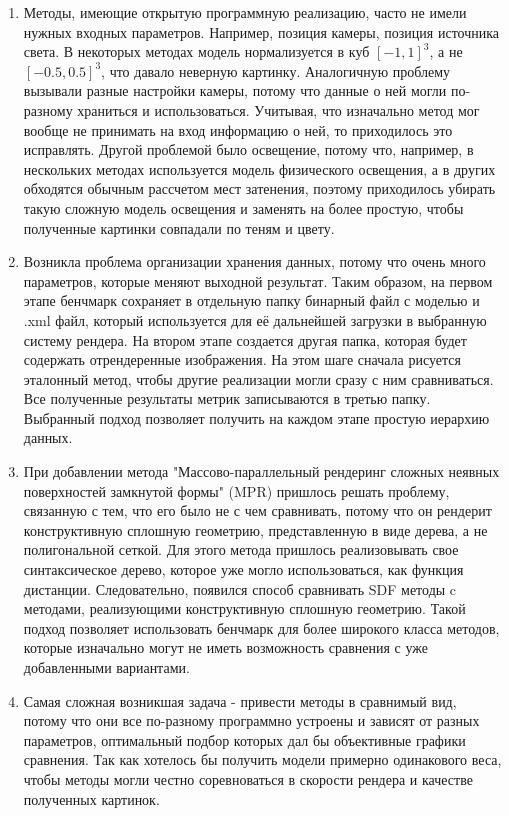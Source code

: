 \documentclass[a4paper,hidelinks,12pt]{article}
\begin{document}
\begin{enumerate}
	\item Методы, имеющие открытую программную реализацию, часто не имели нужных входных параметров. Например, позиция камеры, позиция источника света. В некоторых методах 
	модель нормализуется в куб $[-1, 1]^3$, а не $[-0.5, 0.5]^3$, что давало неверную картинку. Аналогичную проблему вызывали разные настройки камеры, потому что 
	данные о ней могли по-разному храниться и использоваться. Учитывая, что изначально метод мог вообще не принимать на вход информацию о ней, то приходилось 
	это исправлять. Другой проблемой было освещение, потому что, например, в нескольких методах используется модель физического освещения, а в других 
	обходятся обычным рассчетом мест затенения, поэтому приходилось убирать такую сложную модель освещения и заменять на более простую, чтобы полученные картинки 
	совпадали по теням и цвету. 
	\item Возникла проблема организации хранения данных, потому что очень много параметров, которые меняют выходной результат. Таким образом, на первом этапе 
	бенчмарк сохраняет в отдельную папку бинарный файл с моделью и .xml файл, который используется для её дальнейшей загрузки в выбранную систему рендера. На втором этапе создается 
	другая папка, которая будет содержать отрендеренные изображения. На этом шаге сначала рисуется эталонный метод, чтобы другие реализации могли сразу с ним 
	сравниваться. Все полученные результаты метрик записываются в третью папку. Выбранный подход позволяет получить на каждом этапе простую иерархию данных.
	\item При добавлении метода "Массово-параллельный рендеринг сложных неявных поверхностей замкнутой формы" (MPR) пришлось решать проблему, связанную с тем, 
	что его было не с чем сравнивать, потому что он рендерит конструктивную сплошную геометрию, представленную в виде дерева, а не полигональной сеткой. Для этого метода пришлось 
	реализовывать свое синтаксическое дерево, которое уже могло использоваться, как функция дистанции. Следовательно, появился способ сравнивать SDF методы c 
	методами, реализующими конструктивную сплошную геометрию. Такой подход позволяет использовать бенчмарк для более широкого класса методов, которые изначально 
	могут не иметь возможность сравнения с уже добавленными вариантами.
	\item Самая сложная возникшая задача - привести методы в сравнимый вид, потому что они все по-разному программно устроены и зависят от разных параметров, 
	оптимальный подбор которых дал бы объективные графики сравнения. Так как хотелось бы получить модели примерно одинакового веса, чтобы методы могли 
	честно соревноваться в скорости рендера и качестве полученных картинок.
\end{enumerate}
\end{document}
